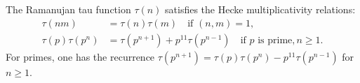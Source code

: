 The Ramanujan tau function $\tau(n)$ satisfies the Hecke multiplicativity relations:
\begin{align*}
\tau(nm) &= \tau(n)\tau(m) \quad \text{if } (n, m) = 1,\\
\tau(p)\tau(p^n) &= \tau(p^{n+1}) + p^{11}\tau(p^{n-1}) \quad \text{if } p \text{ is prime}, n \geq 1.
\end{align*}
For primes, one has the recurrence $\tau(p^{n+1}) = \tau(p)\tau(p^n) - p^{11}\tau(p^{n-1})$ for $n \geq 1$.
